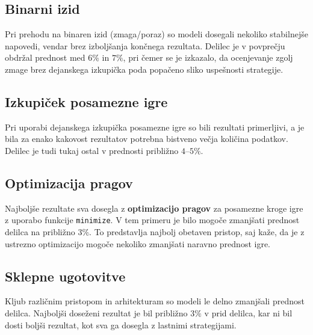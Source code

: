 \documentclass[a4paper,12pt]{article}
\begin{document}
\subsection*{Binarni izid}
Pri prehodu na binaren izid (zmaga/poraz) so modeli dosegali nekoliko stabilnejše napovedi, 
vendar brez izboljšanja končnega rezultata. Delilec je v povprečju obdržal prednost med $6\%$ in $7\%$, 
pri čemer se je izkazalo, da ocenjevanje zgolj zmage brez dejanskega izkupička 
poda popačeno sliko uspešnosti strategije.

\subsection*{Izkupiček posamezne igre}
Pri uporabi dejanskega izkupička posamezne igre so bili rezultati primerljivi, 
a je bila za enako kakovost rezultatov potrebna bistveno večja količina podatkov. 
Delilec je tudi tukaj ostal v prednosti približno $4$--$5\%$.

\subsection*{Optimizacija pragov}
Najboljše rezultate sva dosegla z \textbf{optimizacijo pragov} za posamezne kroge igre 
z uporabo funkcije \texttt{minimize}. V tem primeru je bilo mogoče zmanjšati prednost delilca 
na približno $3\%$. To predstavlja najbolj obetaven pristop, saj kaže, da je z ustrezno optimizacijo 
mogoče nekoliko zmanjšati naravno prednost igre.

\subsection*{Sklepne ugotovitve}
Kljub različnim pristopom in arhitekturam so modeli le delno zmanjšali prednost delilca. 
Najboljši doseženi rezultat je bil približno $3\%$ v prid delilca, kar ni bil dosti boljši
rezultat, kot sva ga dosegla z lastnimi strategijami.
\end{document}
